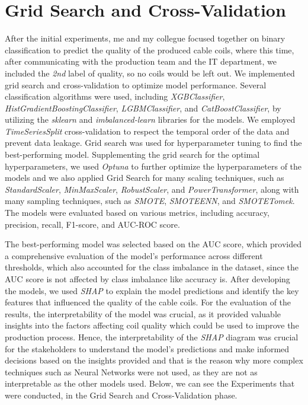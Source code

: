 \section{Grid Search and Cross-Validation}

After the initial experiments, me and my collegue focused together on binary
classification to predict the quality of the produced cable coils, where this
time, after communicating with the production team and the IT department, we
included the \emph{2nd} label of quality, so no coils would be left out. We
implemented grid search and cross-validation to optimize model performance.
Several classification algorithms were used, including \emph{XGBClassifier},
\emph{HistGradientBoostingClassifier}, \emph{LGBMClassifier}, and
\emph{CatBoostClassifier}, by utilizing the \emph{sklearn} and
\emph{imbalanced-learn} libraries for the models. We employed
\emph{TimeSeriesSplit} cross-validation to respect the temporal order of the
data and prevent data leakage. Grid search was used for hyperparameter tuning
to find the best-performing model. Supplementing the grid search for the
optimal hyperparameters, we used \emph{Optuna} to further optimize the
hyperparameters of the models and we also applied Grid Search for many scaling
techniques, such as \emph{StandardScaler}, \emph{MinMaxScaler},
\emph{RobustScaler}, and \emph{PowerTransformer}, along with many sampling
techniques, such as \emph{SMOTE}, \emph{SMOTEENN}, and \emph{SMOTETomek}. The
models were evaluated based on various metrics, including accuracy, precision,
recall, F1-score, and AUC-ROC score.

The best-performing model was selected based on the AUC score, which provided a
comprehensive evaluation of the model's performance across different
thresholds, which also accounted for the class imbalance in the dataset, since
the AUC score is not affected by class imbalance like accuracy is. After
developing the models, we used \emph{SHAP} to explain the model predictions and
identify the key features that influenced the quality of the cable coils. For
the evaluation of the results, the interpretability of the model was crucial,
as it provided valuable insights into the factors affecting coil quality which
could be used to improve the production process. Hence, the interpretability of
the \emph{SHAP} diagram was crucial for the stakeholders to understand the
model's predictions and make informed decisions based on the insights provided
and that is the reason why more complex techniques such as Neural Networks were
not used, as they are not as interpretable as the other models used. Below, we
can see the Experiments that were conducted, in the Grid Search and
Cross-Validation phase.

